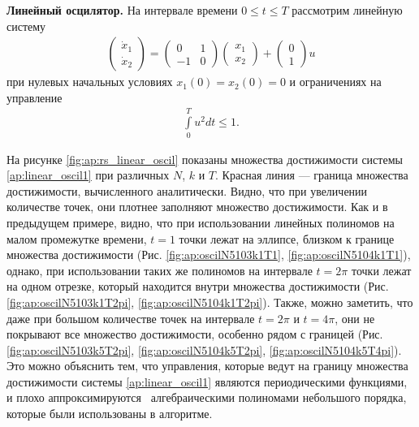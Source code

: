 \documentclass[../main.tex]{subfiles}
\begin{document}
  \textbf{Линейный осцилятор.} На интервале времени $ 0 \leqslant t \leqslant T$ рассмотрим линейную систему 
  \begin{gather}\label{ap:linear_oscil1}
  	\begin{pmatrix} 
  		\dot{x}_1 \\
  		\dot{x}_2  
  	\end{pmatrix} = 
  	\begin{pmatrix}
  		0 & 1 \\
  		-1 & 0
  	\end{pmatrix}
  	\begin{pmatrix} 
  		x_1 \\
  		x_2  
  	\end{pmatrix} +
  	\begin{pmatrix} 0 \\ 1
  	\end{pmatrix} u
  \end{gather}
  при нулевых начальных условиях $x_1(0) = x_2(0) = 0 $ и ограничениях на управление 
  \begin{gather*}
  	\int\limits_0^T u^2dt \leqslant 1.
  \end{gather*}
  
  На рисунке \ref{fig:ap:rs_linear_oscil} показаны множества достижимости системы \eqref{ap:linear_oscil1} при различных $N$, $k$ и $T$.
  Красная линия --- граница множества достижимости, вычисленного аналитически.
  Видно, что при увеличении количестве точек, они плотнее заполняют множество достижимости.
  Как и в предыдущем примере, видно, что при использовании линейных полиномов на малом промежутке времени, $t = 1$ точки лежат на эллипсе, близком к границе множества достижимости (Рис. \ref{fig:ap:oscilN5103k1T1}, \ref{fig:ap:oscilN5104k1T1}), однако, при использовании таких же полиномов на интервале $t = 2\pi$ точки лежат на одном отрезке, который находится внутри множества достижимости (Рис. \ref{fig:ap:oscilN5103k1T2pi}, \ref{fig:ap:oscilN5104k1T2pi}). 
  Также, можно заметить, что даже при большом количестве точек на интервале  $t = 2\pi$ и $t = 4\pi$, они не покрывают все множество достижимости, особенно рядом с границей (Рис. \ref{fig:ap:oscilN5103k5T2pi}, \ref{fig:ap:oscilN5104k5T2pi}, \ref{fig:ap:oscilN5104k5T4pi}). 
  Это можно объяснить тем, что управления, которые ведут на границу множества достижимости системы  \eqref{ap:linear_oscil1} являются периодическими функциями, и плохо аппроксимируются  алгебраическими полиномами небольшого порядка, которые были использованы в алгоритме.
  
\end{document}
